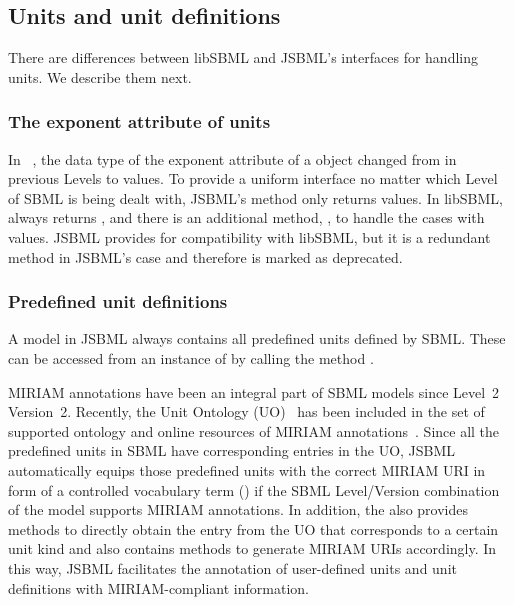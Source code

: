\subsection{Units and unit definitions}
\label{sec:units}

There are differences between libSBML and JSBML's interfaces for handling
units.  We describe them next.


\subsubsection{The exponent attribute of units}

In \SBMLthree~\citep{Hucka2010a}, the data type of the exponent attribute
of a \Unit object changed from  in previous Levels to
 values. To provide a uniform interface no matter which Level
of SBML is being dealt with, JSBML's method  only
returns  values. In libSBML,  always
returns , and there is an additional method,
, to handle the cases with 
values.  JSBML provides  for compatibility with
libSBML, but it is a redundant method in JSBML's case and therefore is marked
as deprecated.
%
%


\subsubsection{Predefined unit definitions}

A model in JSBML  always contains all
predefined units defined by SBML.  These can be accessed from an instance
of  by calling the method .

MIRIAM annotations \citep{Novere2005} have been
an integral part of SBML models since Level~2 Version~2. Recently, the  Unit Ontology
(UO)~\citep{unitontology}  has been
included in the set of supported ontology and online resources of MIRIAM
annotations~\citep{Novere2005}. Since all the predefined units in SBML have
corresponding entries in the UO, JSBML %
automatically equips those predefined units with the correct MIRIAM URI in
form of a controlled vocabulary term () if the SBML
Level/Version combination of the model supports MIRIAM annotations.  In
addition, the  
%
also provides methods to directly obtain the entry from the UO that
corresponds to a certain unit kind and also contains methods to generate
MIRIAM URIs accordingly. In this way, JSBML facilitates the annotation of
user-defined units and unit definitions with MIRIAM-compliant
 information.


